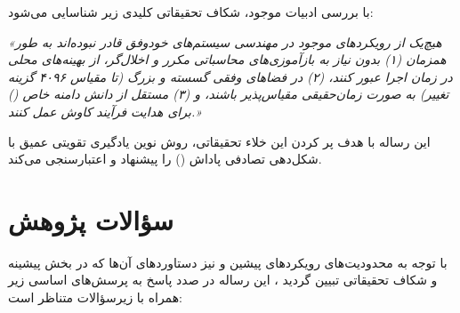 \documentclass[oneside,openany,phd]{TMU-Thesis}
\begin{document}
با بررسی ادبیات موجود، شکاف تحقیقاتی کلیدی زیر شناسایی می‌شود:
\begin{center}
\textit{«هیچ‌یک از رویکردهای موجود در مهندسی سیستم‌های خودوفق قادر نبوده‌اند به طور همزمان (۱) بدون نیاز به بازآموزی‌های محاسباتی مکرر و اخلال‌گر، از بهینه‌های محلی در زمان اجرا عبور کنند، (۲) در فضاهای وفقی گسسته و بزرگ (تا مقیاس ۴۰۹۶ گزینه تغییر) به صورت زمان‌حقیقی مقیاس‌پذیر باشند، و (۳) مستقل از دانش دامنه خاص () برای هدایت فرآیند کاوش عمل کنند.»}
\end{center}
این رساله با هدف پر کردن این خلاء تحقیقاتی، روش نوین یادگیری تقویتی عمیق با شکل‌دهی تصادفی پاداش () را پیشنهاد و اعتبارسنجی می‌کند.

\section{سؤالات پژوهش}

با توجه به محدودیت‌های رویکردهای پیشین و نیز دستاوردهای آن‌ها که در بخش پیشینه و شکاف تحقیقاتی تبیین گردید \cite{cheng2009software, gheibi2024dealing}، این رساله در صدد پاسخ به پرسش‌های اساسی زیر همراه با زیرسؤالات متناظر است:
\end{document}

